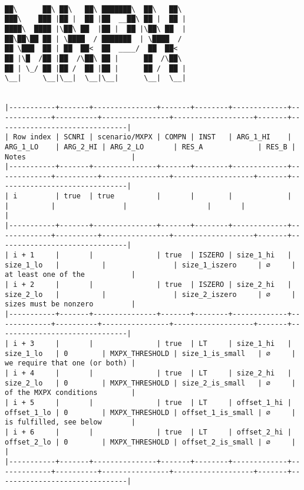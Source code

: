 \documentclass[varwidth=\maxdimen,margin=0.5cm,multi={verbatim}]{standalone}
\begin{document}
\begin{verbatim}

██\      ██\ ██\   ██\ ███████\  ██\   ██\
███\    ███ |██ |  ██ |██  __██\ ██ |  ██ |
████\  ████ |\██\ ██  |██ |  ██ |\██\ ██  |
██\██\██ ██ | \████  / ███████  | \████  /
██ \███  ██ | ██  ██<  ██  ____/  ██  ██<
██ |\█  /██ |██  /\██\ ██ |      ██  /\██\
██ | \_/ ██ |██ /  ██ |██ |      ██ /  ██ |
\__|     \__|\__|  \__|\__|      \__|  \__|


|-----------+-------+---------------+-------+--------+-------------+-------------+----------+----------------+-------------------+-------+-------------------------------|
| Row index | SCNRI | scenario/MXPX | COMPN | INST   | ARG_1_HI    | ARG_1_LO    | ARG_2_HI | ARG_2_LO       | RES_A             | RES_B | Notes                         |
|-----------+-------+---------------+-------+--------+-------------+-------------+----------+----------------+-------------------+-------+-------------------------------|
| i         | true  | true          |       |        |             |             |          |                |                   |       |                               |
|-----------+-------+---------------+-------+--------+-------------+-------------+----------+----------------+-------------------+-------+-------------------------------|
| i + 1     |       |               | true  | ISZERO | size_1_hi   | size_1_lo   |          |                | size_1_iszero     | ∅     | at least one of the           |
| i + 2     |       |               | true  | ISZERO | size_2_hi   | size_2_lo   |          |                | size_2_iszero     | ∅     | sizes must be nonzero         |
|-----------+-------+---------------+-------+--------+-------------+-------------+----------+----------------+-------------------+-------+-------------------------------|
| i + 3     |       |               | true  | LT     | size_1_hi   | size_1_lo   | 0        | MXPX_THRESHOLD | size_1_is_small   | ∅     | we require that one (or both) |
| i + 4     |       |               | true  | LT     | size_2_hi   | size_2_lo   | 0        | MXPX_THRESHOLD | size_2_is_small   | ∅     | of the MXPX conditions        |
| i + 5     |       |               | true  | LT     | offset_1_hi | offset_1_lo | 0        | MXPX_THRESHOLD | offset_1_is_small | ∅     | is fulfilled, see below       |
| i + 6     |       |               | true  | LT     | offset_2_hi | offset_2_lo | 0        | MXPX_THRESHOLD | offset_2_is_small | ∅     |                               |
|-----------+-------+---------------+-------+--------+-------------+-------------+----------+----------------+-------------------+-------+-------------------------------|


\end{verbatim}
\end{document}
